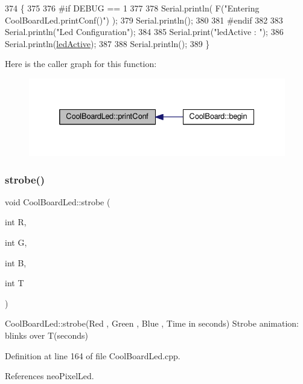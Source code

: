 \begin{DoxyCode}
374 \{
375 
376 \textcolor{preprocessor}{#if DEBUG == 1 }
377 
378     Serial.println( F(\textcolor{stringliteral}{"Entering CoolBoardLed.printConf()"}) );
379     Serial.println();
380 
381 \textcolor{preprocessor}{#endif}
382 
383     Serial.println(\textcolor{stringliteral}{"Led Configuration"});
384 
385     Serial.print(\textcolor{stringliteral}{"ledActive : "});
386     Serial.println(\hyperlink{classCoolBoardLed_a5f17c135516fcf4b44ea8a096ba0177a}{ledActive});
387 
388     Serial.println();   
389 \}
\end{DoxyCode}
Here is the caller graph for this function\+:\nopagebreak
\begin{figure}[H]
\begin{center}
\leavevmode
\includegraphics[width=332pt]{classCoolBoardLed_a8ed3053a36f0ed4a131f43b5b17efb61_icgraph}
\end{center}
\end{figure}
\mbox{\label{classCoolBoardLed_adc08c0ac07473499971c503d300f0413}} 
\subsubsection{\texorpdfstring{strobe()}{strobe()}}
{\footnotesize\ttfamily void Cool\+Board\+Led\+::strobe (\begin{DoxyParamCaption}\item[{int}]{R,  }\item[{int}]{G,  }\item[{int}]{B,  }\item[{int}]{T }\end{DoxyParamCaption})}

Cool\+Board\+Led\+::strobe(\+Red , Green , Blue , Time in seconds) Strobe animation\+: blinks over T(seconds) 

Definition at line 164 of file Cool\+Board\+Led.\+cpp.



References neo\+Pixel\+Led.


